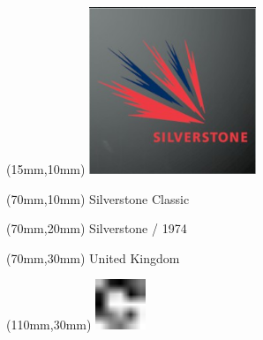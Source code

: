 \null\newpage
\begin{textblock*}{50mm}(15mm,10mm)%
\includegraphics[width=50mm]{LG/2015-05-20_00094.png}
\end{textblock*}
\begin{textblock*}{130mm}(70mm,10mm)%
{\fontsize{20}{20}\selectfont Silverstone Classic}\\
\end{textblock*}
\begin{textblock*}{120mm}(70mm,20mm)%
{\fontsize{16}{16}\selectfont Silverstone / 1974}\\
\end{textblock*}
\begin{textblock*}{120mm}(70mm,30mm)%
{\fontsize{12}{12}\selectfont United Kingdom}
\end{textblock*}
\begin{textblock*}{30mm}(110mm,30mm)%
\centering
\includegraphics[height=15mm]{icons/fa-rotate-right.pdf}
\end{textblock*}
